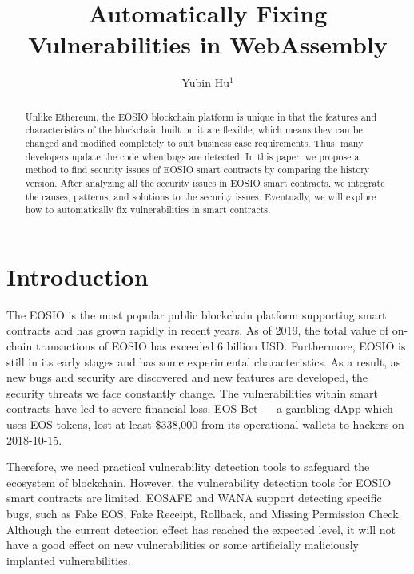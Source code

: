 \documentclass[a4paper, 10pt, conference, twocolumn]{ieeeconf}       %
\title{\LARGE \bf
Automatically Fixing Vulnerabilities in WebAssembly
}
\author{Yubin Hu$^{1}$ %
}
\begin{document}
\maketitle
\thispagestyle{empty}
\pagestyle{empty}


\begin{abstract}

Unlike Ethereum, the EOSIO blockchain platform is unique in that the features and characteristics of the blockchain built on it are flexible, which means they can be changed and modified completely to suit business case requirements.
Thus, many developers update the code when bugs are detected.
In this paper, we propose a method to find security issues of EOSIO smart contracts by comparing the history version.
After analyzing all the security issues in EOSIO smart contracts,
we integrate the causes, patterns, and solutions to the security issues.
Eventually, we will explore how to automatically fix vulnerabilities in smart contracts.

\end{abstract}


\section{Introduction}

The EOSIO is the most popular public blockchain platform supporting smart contracts and has grown rapidly in recent years.
As of 2019, the total value of on-chain transactions of EOSIO has exceeded 6 billion USD.
Furthermore, EOSIO is still in its early stages and has some experimental characteristics.
As a result, as new bugs and security are discovered and new features are developed, the security threats we face constantly change.
The vulnerabilities within smart contracts have led to severe financial loss.
EOS Bet — a gambling dApp which uses EOS tokens, lost at least \$338,000 from its operational wallets to hackers on 2018-10-15\cite{medium:2018}.

Therefore, we need practical vulnerability detection tools to safeguard the ecosystem of blockchain.
However, the vulnerability detection tools for EOSIO smart contracts are limited.
EOSAFE\cite{272292} and WANA\cite{Wang2020WANASE} support detecting specific bugs, such as Fake EOS, Fake Receipt, Rollback, and Missing Permission Check.\cite{eosio}
Although the current detection effect has reached the expected level, it will not have a good effect on new vulnerabilities or some artificially maliciously implanted vulnerabilities.
\end{document}
